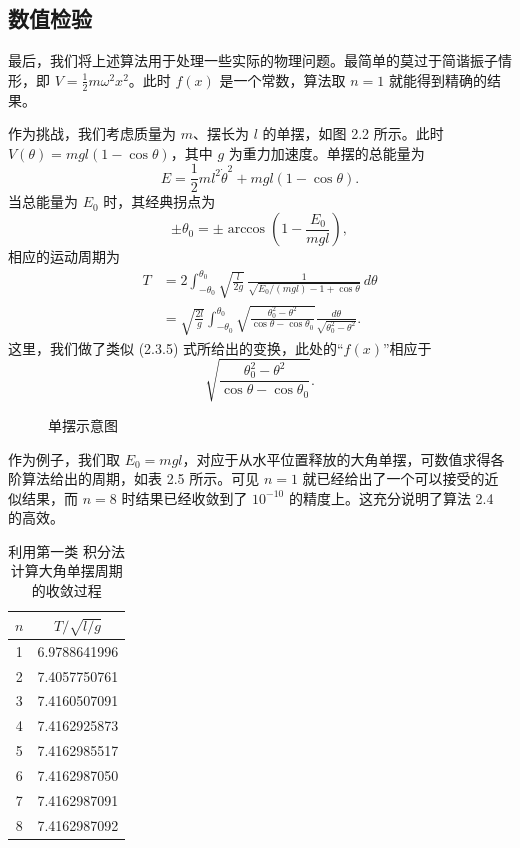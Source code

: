 \subsection{数值检验}

最后，我们将上述算法用于处理一些实际的物理问题。最简单的莫过于简谐振子情形，即 $V=\frac12m\omega^2x^2$。此时 $f(x)$ 是一个常数，算法取 $n=1$ 就能得到精确的结果。

作为挑战，我们考虑质量为 $m$、摆长为 $l$ 的单摆，如图 2.2 所示。此时 $V(\theta)=mgl(1-\cos\theta)$，其中 $g$ 为重力加速度。单摆的总能量为
\[
E=\frac12ml^2\dot\theta^2+mgl(1-\cos\theta).
\]
当总能量为 $E_0$ 时，其经典拐点为
\[
\pm\theta_0=\pm\arccos\left(1-\frac{E_0}{mgl}\right),
\]
相应的运动周期为
\[
\begin{aligned}
T&=2\int_{-\theta_0}^{\theta_0}\sqrt{\frac{l}{2g}}\,
\frac{1}{\sqrt{E_0/(mgl)-1+\cos\theta}}\,d\theta\\
&=\sqrt{\frac{2l}{g}}\int_{-\theta_0}^{\theta_0}
\sqrt{\frac{\theta_0^2-\theta^2}{\cos\theta-\cos\theta_0}}
\frac{d\theta}{\sqrt{\theta_0^2-\theta^2}}.
\end{aligned}
\]
这里，我们做了类似 (2.3.5) 式所给出的变换，此处的“$f(x)$”相应于
\[
\sqrt{\frac{\theta_0^2-\theta^2}{\cos\theta-\cos\theta_0}}.
\]

\begin{figure}[htbp]
\centering
{}
\caption{单摆示意图}
\label{fig:pendulum}
\end{figure}

作为例子，我们取 $E_0=mgl$，对应于从水平位置释放的大角单摆，可数值求得各阶算法给出的周期，如表 2.5 所示。可见 $n=1$ 就已经给出了一个可以接受的近似结果，而 $n=8$ 时结果已经收敛到了 $10^{-10}$ 的精度上。这充分说明了算法 2.4 的高效。

\begin{table}[htbp]
\centering
\caption{利用第一类 \ChebName{} 积分法计算大角单摆周期的收敛过程}
\label{tab:cheb-pendulum}
\begin{tabular}{cc}
\toprule
$n$ & $T/\sqrt{l/g}$\\
\midrule
1 & 6.9788641996\\
2 & 7.4057750761\\
3 & 7.4160507091\\
4 & 7.4162925873\\
5 & 7.4162985517\\
6 & 7.4162987050\\
7 & 7.4162987091\\
8 & 7.4162987092\\
\bottomrule
\end{tabular}
\end{table}

